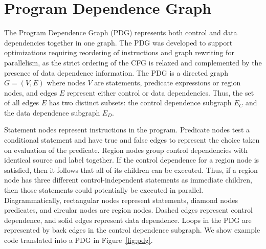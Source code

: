 \section{Program Dependence Graph}
\label{section:vsdg:pdg}
The Program Dependence Graph (PDG) represents both control and data dependencies together in one graph. 
The PDG was developed to support optimizations requiring reordering of instructions and graph rewriting for parallelism, as the strict ordering of the CFG is relaxed and complemented by the presence of data dependence information. 
The PDG is a directed graph $G=(V,E)$ where nodes $V$ are statements, predicate expressions or region nodes, and edges $E$ represent either control or data dependencies. 
Thus, the set of all edges $E$ has two distinct subsets: 
the control dependence subgraph $E_{C}$ and the data dependence subgraph $E_{D}$.

Statement nodes represent instructions in the program. 
Predicate nodes test a conditional statement and have {\sf true} and {\sf false} edges to represent the choice taken on evaluation of the predicate. 
Region nodes group control dependencies with identical source and label together. 
If the control dependence for a region node is satisfied, then it follows that all of its children can be executed. 
Thus, if a region node has three different control-independent statements as immediate children, then those statements could potentially be executed in parallel. 
Diagrammatically, rectangular nodes represent statements, diamond nodes predicates, and circular nodes are region nodes. 
Dashed edges represent control dependence, and solid edges represent data dependence. 
Loops in the PDG are represented by back edges in the control dependence subgraph. 
We show example code translated into a PDG in Figure~\ref{fig:pdg}.

